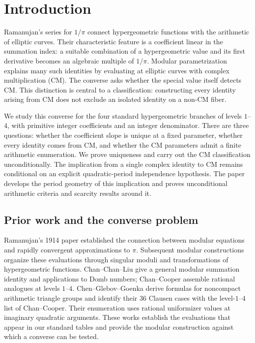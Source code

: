 \section{Introduction}\label{rev:sec:introduction}

Ramanujan's series for $1/\pi$ connect hypergeometric functions with
the arithmetic of elliptic curves. Their characteristic feature is a
coefficient linear in the summation index: a suitable combination of
a hypergeometric value and its first derivative becomes an algebraic
multiple of $1/\pi$. Modular parametrization explains many such
identities by evaluating at elliptic curves with complex multiplication
(CM). The converse asks whether the special value itself detects CM.
This distinction is central to a classification: constructing every
identity arising from CM does not exclude an isolated identity on a
non-CM fiber.

We study this converse for the four standard hypergeometric branches
of levels $1$--$4$, with primitive integer coefficients and an integer
denominator. There are three questions: whether the coefficient slope
is unique at a fixed parameter, whether every identity comes from CM,
and whether the CM parameters admit a finite arithmetic enumeration.
We prove uniqueness and carry out the CM classification unconditionally.
The implication from a single complex identity to CM remains
conditional on an explicit quadratic-period independence hypothesis.
The paper develops the period geometry of this implication and proves
unconditional arithmetic criteria and scarcity results around it.

\subsection{Prior work and the converse problem}
Ramanujan's 1914 paper \cite{Ramanujan1914} established the connection
between modular equations and rapidly convergent approximations to
$\pi$. Subsequent modular constructions organize these evaluations
through singular moduli and transformations of hypergeometric
functions. Chan--Chan--Liu \cite{CCL} give a general modular summation
identity and applications to Domb numbers; Chan--Cooper
\cite{ChanCooper} assemble rational analogues at levels $1$--$4$.
Chen--Glebov--Goenka \cite{CGG} derive formulas for noncompact arithmetic
triangle groups and identify their $36$ Clausen cases with the
level-$1$--$4$ list of Chan--Cooper. Their enumeration uses rational
uniformizer values at imaginary quadratic arguments. These works
establish the evaluations that appear in our standard tables and
provide the modular construction against which a converse can be tested.

